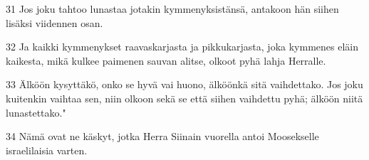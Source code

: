 \par 31 Jos joku tahtoo lunastaa jotakin kymmenyksistänsä, antakoon hän siihen lisäksi viidennen osan.
\par 32 Ja kaikki kymmenykset raavaskarjasta ja pikkukarjasta, joka kymmenes eläin kaikesta, mikä kulkee paimenen sauvan alitse, olkoot pyhä lahja Herralle.
\par 33 Älköön kysyttäkö, onko se hyvä vai huono, älköönkä sitä vaihdettako. Jos joku kuitenkin vaihtaa sen, niin olkoon sekä se että siihen vaihdettu pyhä; älköön niitä lunastettako."
\par 34 Nämä ovat ne käskyt, jotka Herra Siinain vuorella antoi Moosekselle israelilaisia varten.


